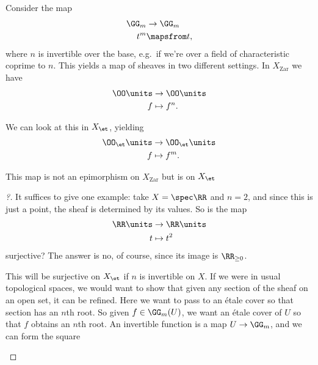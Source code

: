 \begin{example}[?]

Consider the map
\begin{align*}  
\GG_m &\to \GG_m \\
t^m &\mapsfrom t
,\end{align*} where \(n\) is invertible over the base, e.g.~if we're
over a field of characteristic coprime to \(n\). This yields a map of
sheaves in two different settings. In \(X_{\mathrm{Zar}}\) we have
\begin{align*}  
\OO\units &\to \OO\units \\
f &\mapsto f^n
.\end{align*}

We can look at this in \(X_{\et}\), yielding
\begin{align*}  
\OO_\et\units &\to \OO_\et\units \\
f &\mapsto f^m
.\end{align*}

\begin{claim}

This map is not an epimorphism on \(X_{\mathrm{Zar}}\) but is on
\(X_{\et}\)

\end{claim}

\begin{proof}[?]

It suffices to give one example: take \(X = \spec \RR\) and \(n=2\), and
since this is just a point, the sheaf is determined by its values. So is
the map
\begin{align*}  
\RR\units &\to \RR\units \\
t &\mapsto t^2
\end{align*} surjective? The answer is no, of course, since its image is
\(\RR_{\geq 0}\).

This will be surjective on \(X_{\et}\) if \(n\) is invertible on \(X\).
If we were in usual topological spaces, we would want to show that given
any section of the sheaf on an open set, it can be refined. Here we want
to pass to an étale cover so that section has an \(n\)th root. So given
\(f\in \GG_m(U)\), we want an étale cover of \(U\) so that \(f\) obtains
an \(n\)th root. An invertible function is a map \(U\to \GG_m\), and we
can form the square

\begin{center}
\end{center}


\end{proof}
\end{example}
